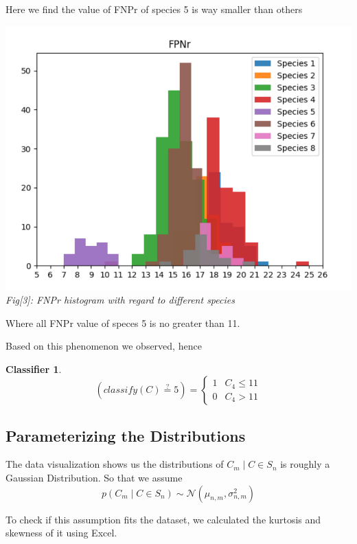\documentclass[12pt]{article}
\newtheorem{classifier}{Classifier}
\begin{document}
		Here we find the value of FNPr of species 5 is way smaller than others
		
		\begin{center}
			\includegraphics[scale=0.7]{fig3} \\
			\textit{Fig[3]: FNPr histogram with regard to different species}
		\end{center}
		
		\noindent Where all FNPr value of speces 5 is no greater than 11.
				
		Based on this phenomenon we observed, hence
		
		\begin{classifier}
			\begin{equation*}
				(classify(C) \stackrel{?}{=} 5) =
				\begin{cases}
					1 & C_4 \leq 11 \\
					0 & C_4 > 11
				\end{cases}
			\end{equation*}
		\end{classifier}
	
	\subsection{Parameterizing the Distributions}
		
		The data visualization shows us the distributions of $C_m \mid C \in S_n$ is roughly a
		Gaussian Distribution. So that we assume
		$$p(C_m \mid C \in S_n) \sim \mathcal{N}(\mu_{n, m}, \sigma_{n, m}^2)$$
		
		To check if this assumption fits the dataset, we calculated the kurtosis and skewness of it using Excel.
		
\end{document}
